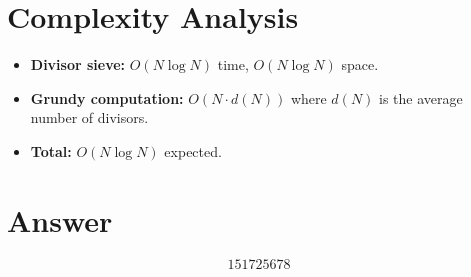 \documentclass[11pt]{article}
\begin{document}
\section{Complexity Analysis}
\begin{itemize}
    \item \textbf{Divisor sieve:} $O(N \log N)$ time, $O(N \log N)$ space.
    \item \textbf{Grundy computation:} $O(N \cdot d(N))$ where $d(N)$ is the average number of divisors.
    \item \textbf{Total:} $O(N \log N)$ expected.
\end{itemize}

\section{Answer}

\[
\boxed{151725678}
\]
\end{document}
